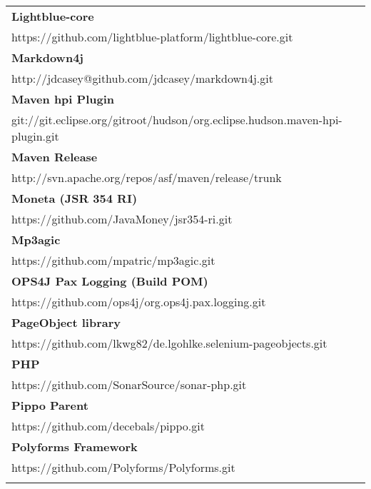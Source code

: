 \begin{table}[]
\small
\begin{tabular}{|p{130mm}|}
\hline 
\bf Lightblue-core                                     \\ https://github.com/lightblue-platform/lightblue-core.git                     \\ \hline \bf
Markdown4j                                         \\ http://jdcasey@github.com/jdcasey/markdown4j.git                             \\ \hline \bf
Maven hpi Plugin                                   \\ git://git.eclipse.org/gitroot/hudson/org.eclipse.hudson.maven-hpi-plugin.git \\ \hline \bf
Maven Release                                      \\ http://svn.apache.org/repos/asf/maven/release/trunk                          \\ \hline \bf
Moneta (JSR 354 RI)                                \\ https://github.com/JavaMoney/jsr354-ri.git                                   \\ \hline \bf
Mp3agic                                            \\ https://github.com/mpatric/mp3agic.git                                       \\ \hline \bf
OPS4J Pax Logging (Build POM)                      \\ https://github.com/ops4j/org.ops4j.pax.logging.git                       \\ \hline \bf
PageObject library                                 \\ https://github.com/lkwg82/de.lgohlke.selenium-pageobjects.git                \\ \hline \bf
PHP                                                \\ https://github.com/SonarSource/sonar-php.git                                 \\ \hline \bf
Pippo Parent                                       \\ https://github.com/decebals/pippo.git                                        \\ \hline \bf
Polyforms Framework                                \\ https://github.com/Polyforms/Polyforms.git                                   \\ \hline \bf

\end{tabular}
\end{table}
